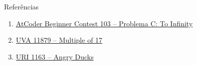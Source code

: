 \begin{frame}[fragile]{Referências}

    \begin{enumerate}
        \item \href{https://atcoder.jp/contests/abc106/tasks/abc106_c}{AtCoder Beginner Contest 103 -- Problema C: To Infinity}

        \item \href{https://uva.onlinejudge.org/index.php?option=com_onlinejudge&Itemid=8&category=24&page=show_problem&problem=3001}{UVA 11879 -- Multiple of 17}

        \item \href{https://www.urionlinejudge.com.br/judge/pt/problems/view/1163}{URI 1163 -- Angry Ducks}
    \end{enumerate}

\end{frame}
